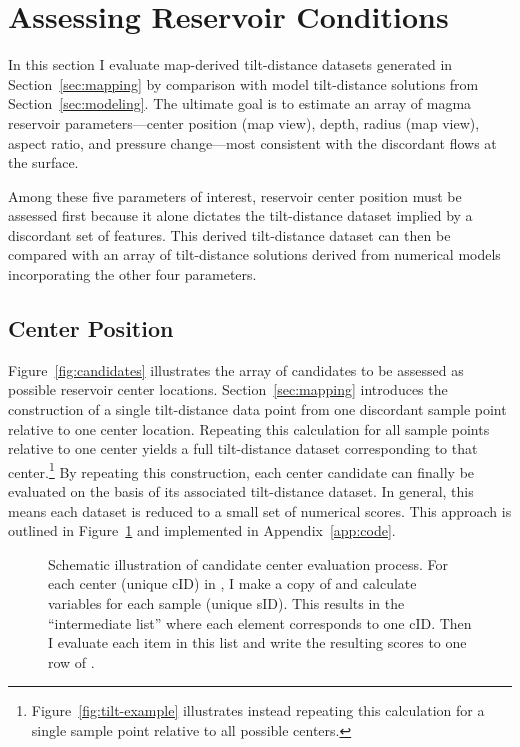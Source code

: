 \section{Assessing Reservoir Conditions}\label{sec:evaluation}

In this section I evaluate map-derived tilt-distance datasets generated in Section~\ref{sec:mapping} by comparison with model tilt-distance solutions from Section~\ref{sec:modeling}. The ultimate goal is to estimate an array of magma reservoir parameters---center position (map view), depth, radius (map view), aspect ratio, and pressure change---most consistent with the discordant flows at the surface. 

Among these five parameters of interest, reservoir center position must be assessed first because it alone dictates the tilt-distance dataset implied by a discordant set of features. This derived tilt-distance dataset can then be compared with an array of tilt-distance solutions derived from numerical models incorporating the other four parameters.

\subsection{Center Position}\label{sec:center-location}

Figure~\ref{fig:candidates} illustrates the array of candidates to be assessed as possible reservoir center locations. Section~\ref{sec:mapping} introduces the construction of a single tilt-distance data point from one discordant sample point relative to one center location. Repeating this calculation for all sample points relative to one center yields a full tilt-distance dataset corresponding to that center.\footnote{Figure~\ref{fig:tilt-example} illustrates instead repeating this calculation for a single sample point relative to all possible centers.} By repeating this construction, each center candidate can finally be evaluated on the basis of its associated tilt-distance dataset. In general, this means each dataset is reduced to a small set of numerical scores. This approach is outlined in Figure~\ref{fig:eval-model} and implemented in Appendix~\ref{app:code}.

\begin{figure}
    \caption[Center evaluation workflow]{Schematic illustration of candidate center evaluation process. For each center (unique cID) in , I make a copy of  and calculate variables for each sample (unique sID). This results in the ``intermediate list'' where each element corresponds to one cID. Then I evaluate each item in this list and write the resulting scores to one row of .}%
    \label{fig:eval-model}
\end{figure}

